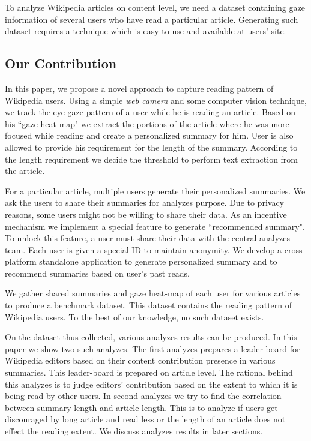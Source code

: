 \documentclass[12pt]{article}
\begin{document}
To analyze Wikipedia articles on content level, we need a dataset containing gaze information of several users who have read a particular article. Generating such dataset requires a technique which is easy to use and available at users' site. 


\subsection{Our Contribution}
In this paper, we propose a novel approach to capture reading pattern of Wikipedia users. Using a simple \emph{web camera} and some computer vision technique, we track the eye gaze pattern of a user while he is reading an article. Based on his ``gaze heat map" we extract the portions of the article where he was more focused while reading and create a personalized summary for him. User is also allowed to provide his requirement for the length of the summary. According to the length requirement we decide the threshold to perform text extraction from the article. 


For a particular article, multiple users generate their personalized summaries. We ask the users to share their summaries for analyzes purpose.  Due to privacy reasons, some users might not be willing to share their data. As an incentive mechanism we implement a special feature to generate ``recommended summary". To unlock this feature, a user must share their data with the central analyzes team. Each user is given a special ID to maintain anonymity. We develop a cross-platform standalone application to generate personalized summary and to recommend summaries based on user's past reads. 


We gather shared summaries and gaze heat-map of each user for various articles to produce a benchmark dataset. This dataset contains the reading pattern of Wikipedia users. To the best of our knowledge, no such dataset exists.


On the dataset thus collected, various analyzes results can be produced. In this paper we show two such analyzes. The first analyzes prepares a leader-board for Wikipedia editors based on their content contribution presence in various summaries. This leader-board is prepared on article level. The rational behind this analyzes is to judge editors' contribution based on the extent to which it is being read by other users. In second analyzes we try to find the correlation between summary length and article length. This is to analyze if users get discouraged by long article and read less or the length of an article does not effect the reading extent. We discuss analyzes results in later sections.  
\end{document}
